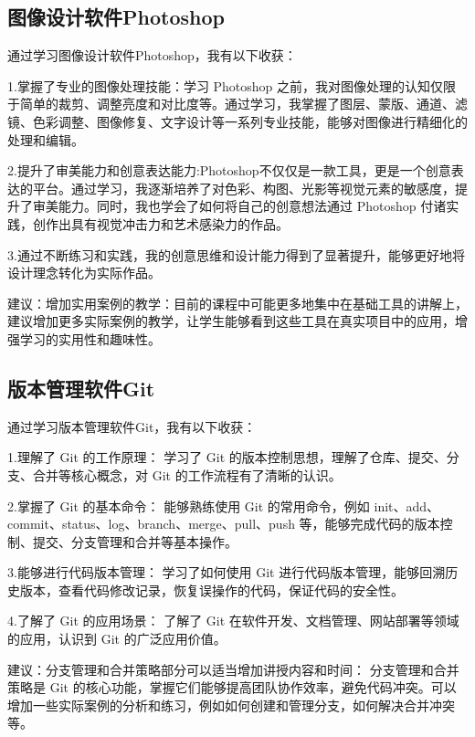 \documentclass[supercite]{Experimental_Report}
\theoremstyle{definition}
\begin{document}
\subsection{图像设计软件Photoshop}
通过学习图像设计软件Photoshop，我有以下收获：
\par 1.掌握了专业的图像处理技能：学习 Photoshop 之前，我对图像处理的认知仅限于简单的裁剪、调整亮度和对比度等。通过学习，我掌握了图层、蒙版、通道、滤镜、色彩调整、图像修复、文字设计等一系列专业技能，能够对图像进行精细化的处理和编辑。
\par 2.提升了审美能力和创意表达能力:Photoshop不仅仅是一款工具，更是一个创意表达的平台。通过学习，我逐渐培养了对色彩、构图、光影等视觉元素的敏感度，提升了审美能力。同时，我也学会了如何将自己的创意想法通过 Photoshop 付诸实践，创作出具有视觉冲击力和艺术感染力的作品。
\par 3.通过不断练习和实践，我的创意思维和设计能力得到了显著提升，能够更好地将设计理念转化为实际作品。

\par 建议：增加实用案例的教学：目前的课程中可能更多地集中在基础工具的讲解上，建议增加更多实际案例的教学，让学生能够看到这些工具在真实项目中的应用，增强学习的实用性和趣味性。

\subsection{版本管理软件Git}
通过学习版本管理软件Git，我有以下收获：

\par 1.理解了 Git 的工作原理： 学习了 Git 的版本控制思想，理解了仓库、提交、分支、合并等核心概念，对 Git 的工作流程有了清晰的认识。
\par 2.掌握了 Git 的基本命令： 能够熟练使用 Git 的常用命令，例如 init、add、commit、status、log、branch、merge、pull、push 等，能够完成代码的版本控制、提交、分支管理和合并等基本操作。
\par 3.能够进行代码版本管理： 学习了如何使用 Git 进行代码版本管理，能够回溯历史版本，查看代码修改记录，恢复误操作的代码，保证代码的安全性。
\par 4.了解了 Git 的应用场景： 了解了 Git 在软件开发、文档管理、网站部署等领域的应用，认识到 Git 的广泛应用价值。

\par 建议：分支管理和合并策略部分可以适当增加讲授内容和时间： 分支管理和合并策略是 Git 的核心功能，掌握它们能够提高团队协作效率，避免代码冲突。可以增加一些实际案例的分析和练习，例如如何创建和管理分支，如何解决合并冲突等。
\end{document}
